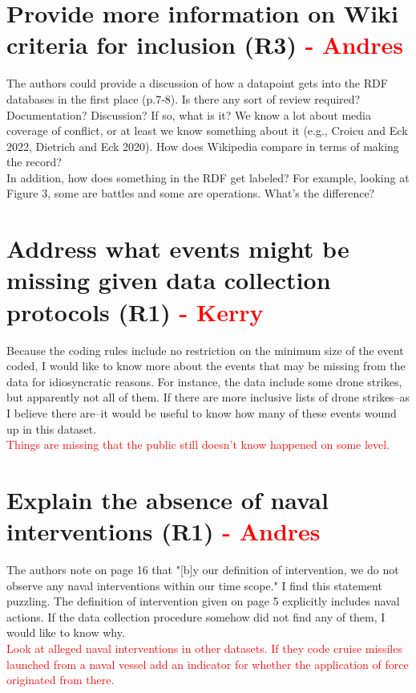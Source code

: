 \documentclass[fleqn,12pt]{article}
\begin{document}
\section{Provide more information on Wiki criteria for inclusion (R3) \textcolor{red}{- Andres}}
The authors could provide a discussion of how a datapoint gets into the RDF databases in the first place (p.7-8). Is there any sort of review required? Documentation? Discussion? If so, what is it? We know a lot about media coverage of conflict, or at least we know something about it (e.g., Croicu and Eck 2022, Dietrich and Eck 2020). How does Wikipedia compare in terms of making the record? \\

\noindent 
In addition, how does something in the RDF get labeled? For example, looking at Figure 3, some are battles and some are operations. What’s the difference? \\

\section{Address what events might be missing given data collection protocols (R1) \textcolor{red}{- Kerry}}
Because the coding rules include no restriction on the minimum size of the event coded, I would like to know more about the events that may be missing from the data for idiosyncratic reasons. For instance, the data include some drone strikes, but apparently not all of them. If there are more inclusive lists of drone strikes--as I believe there are--it would be useful to know how many of these events wound up in this dataset. \\

\textcolor{red}{Things are missing that the public still doesn't know happened on some level.}

\section{Explain the absence of naval interventions (R1) \textcolor{red}{- Andres}}
The authors note on page 16 that "[b]y our definition of intervention, we do not observe any naval interventions within our time scope." I find this statement puzzling. The definition of intervention given on page 5 explicitly includes naval actions. If the data collection procedure somehow did not find any of them, I would like to know why. \\

\textcolor{red}{Look at alleged naval interventions in other datasets. If they code cruise missiles launched from a naval vessel add an indicator for whether the application of force originated from there.}
\end{document}
